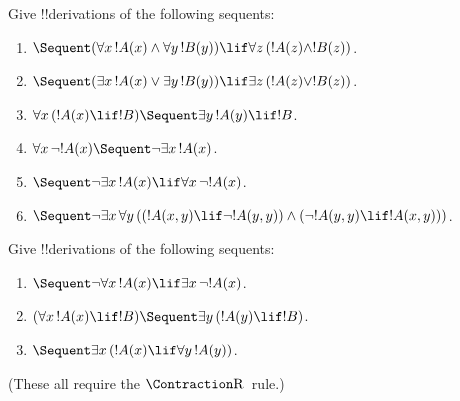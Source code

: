 \documentclass[../../../include/open-logic-section]{subfiles}
\begin{document}
\begin{prob}
Give !!{derivation}s of the following sequents:
\begin{enumerate}
\item $\Sequent (\lforall[x][!A(x)] \land \lforall[y][!B(y)]) \lif
\lforall[z][(!A(z) \land !B(z))]$.
\item $\Sequent (\lexists[x][!A(x)] \lor \lexists[y][!B(y)]) \lif
\lexists[z][(!A(z) \lor !B(z))]$.
\item $\lforall[x][(!A(x) \lif !B)] \Sequent \lexists[y][!A(y)] \lif !B$.
\item $\lforall[x][\lnot !A(x)] \Sequent \lnot\lexists[x][!A(x)]$.
\item $\Sequent \lnot\lexists[x][!A(x)] \lif \lforall[x][\lnot !A(x)]$.
\item $\Sequent \lnot\lexists[x][\lforall[y][((!A(x,y) \lif \lnot
!A(y,y)) \land (\lnot !A(y,y) \lif !A(x,y)))]]$.
\end{enumerate}
\end{prob}

\begin{prob}
Give !!{derivation}s of the following sequents:
\begin{enumerate}
\item $\Sequent \lnot\lforall[x][!A(x)] \lif \lexists[x][\lnot!A(x)]$.
\item $(\lforall[x][!A(x)] \lif !B) \Sequent \lexists[y][(!A(y) \lif !B)]$.
\item $\Sequent \lexists[x][(!A(x) \lif \lforall[y][!A(y)])]$.
\end{enumerate}
(These all require the $\RightR{\Contraction}$~rule.)
\end{prob}
\end{document}
